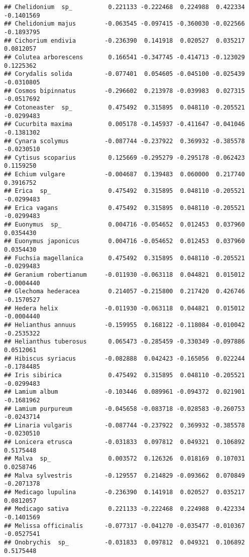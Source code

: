 \documentclass[
]{article}
\begin{document}
\begin{verbatim}
## Chelidonium  sp_          0.221133 -0.222468  0.224988  0.422334 -0.1401569
## Chelidonium majus        -0.063545 -0.097415 -0.360030 -0.022566 -0.1893795
## Cichorium endivia        -0.236390  0.141918  0.020527  0.035217  0.0812057
## Colutea arborescens       0.166541 -0.347745 -0.414713 -0.123029  0.1225362
## Corydalis solida         -0.077401  0.054605 -0.045100 -0.025439 -0.0310805
## Cosmos bipinnatus        -0.296602  0.213978 -0.039983  0.027315 -0.0517692
## Cotoneaster  sp_          0.475492  0.315895  0.048110 -0.205521 -0.0299483
## Cucurbita maxima          0.005178 -0.145937 -0.411647 -0.041046 -0.1381302
## Cynara scolymus          -0.087744 -0.237922  0.369932 -0.385578 -0.0230510
## Cytisus scoparius         0.125669 -0.295279 -0.295178 -0.062423  0.1159250
## Echium vulgare           -0.004687  0.139483  0.060000  0.217740  0.3916752
## Erica  sp_                0.475492  0.315895  0.048110 -0.205521 -0.0299483
## Erica vagans              0.475492  0.315895  0.048110 -0.205521 -0.0299483
## Euonymus  sp_             0.004716 -0.054652  0.012453  0.037960  0.0354430
## Euonymus japonicus        0.004716 -0.054652  0.012453  0.037960  0.0354430
## Fuchsia magellanica       0.475492  0.315895  0.048110 -0.205521 -0.0299483
## Geranium robertianum     -0.011930 -0.063118  0.044821  0.015012 -0.0004440
## Glechoma hederacea        0.214057 -0.215800  0.217420  0.426746 -0.1570527
## Hedera helix             -0.011930 -0.063118  0.044821  0.015012 -0.0004440
## Helianthus annuus        -0.159955  0.168122 -0.118084 -0.010042 -0.2535322
## Helianthus tuberosus      0.065473 -0.285459 -0.330349 -0.097886  0.0512061
## Hibiscus syriacus        -0.082888  0.042423 -0.165056  0.022244 -0.1784485
## Iris sibirica             0.475492  0.315895  0.048110 -0.205521 -0.0299483
## Lamium album             -0.103446  0.089961 -0.094372  0.021901 -0.1681962
## Lamium purpureum         -0.045658 -0.083718 -0.028583 -0.260753 -0.0243714
## Linaria vulgaris         -0.087744 -0.237922  0.369932 -0.385578 -0.0230510
## Lonicera etrusca         -0.031833  0.097812  0.049321  0.106892  0.5175448
## Malva  sp_                0.003572  0.126326  0.018169  0.107031  0.0258746
## Malva sylvestris         -0.129557  0.214829 -0.093662  0.070849 -0.2071378
## Medicago lupulina        -0.236390  0.141918  0.020527  0.035217  0.0812057
## Medicago sativa           0.221133 -0.222468  0.224988  0.422334 -0.1401569
## Melissa officinalis      -0.077317 -0.041270 -0.035477 -0.010367 -0.0527541
## Onobrychis  sp_          -0.031833  0.097812  0.049321  0.106892  0.5175448

\end{verbatim}
\end{document}
